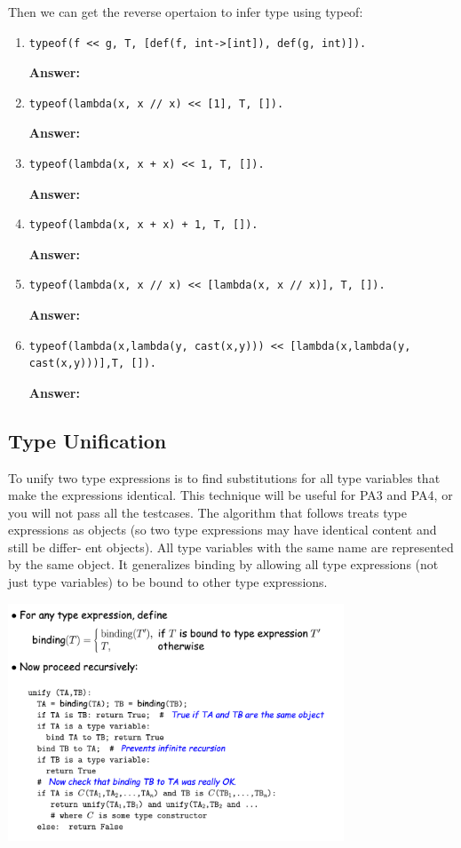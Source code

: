 \documentclass[a4paper]{article}
\theoremstyle{definition}
\begin{document}
Then we can get the reverse opertaion to infer type using typeof:
\begin{enumerate}
  \item \begin{verbatim}
typeof(f << g, T, [def(f, int->[int]), def(g, int)]).
  \end{verbatim}
  
  \textbf{Answer:}
  \item \begin{verbatim}
typeof(lambda(x, x // x) << [1], T, []).
  \end{verbatim}

  \textbf{Answer:}
  \item \begin{verbatim}
typeof(lambda(x, x + x) << 1, T, []).
  \end{verbatim}

  \textbf{Answer:}
  \item \begin{verbatim}
typeof(lambda(x, x + x) + 1, T, []).
  \end{verbatim}

  \textbf{Answer:}
  \item \begin{verbatim}
typeof(lambda(x, x // x) << [lambda(x, x // x)], T, []).
  \end{verbatim}

  \textbf{Answer:}
  \item \begin{verbatim}
typeof(lambda(x,lambda(y, cast(x,y))) << [lambda(x,lambda(y, cast(x,y)))],T, []).
  \end{verbatim}

  \textbf{Answer:}

\end{enumerate}


\subsection{Type Unification}
To unify two type expressions is to find substitutions for all type variables that make the expressions identical. This technique will be useful for PA3 and PA4, or you will not pass all the testcases. The algorithm that follows treats type expressions as objects (so two type expressions may have identical content and still be differ- ent objects). All type variables with the same name are represented by the same object. It generalizes binding by allowing all type expressions (not just type variables) to be bound to other type expressions.

\includegraphics[width=10cm]{img/Snipaste_2021-05-08_04-55-14.png}
\end{document}
